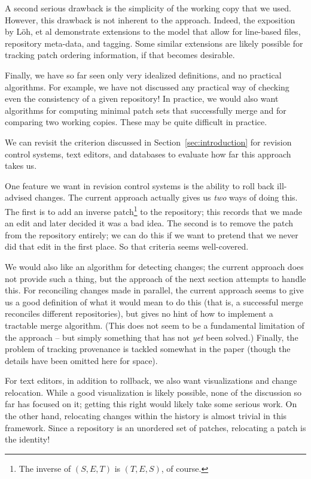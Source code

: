 \documentclass{article}
\newif\ifhighlightnew\highlightnewfalse
\newenvironment{newcontent}{\ifhighlightnew\color{green!55!black}[new]\fi}{\ifhighlightnew\color{black}\fi}
\begin{document}
A second serious drawback is the simplicity of the working copy that we
used. However, this drawback is not inherent to the approach. Indeed, the
exposition by L\"oh, et al demonstrate extensions to the model that allow
for line-based files, repository meta-data, and tagging. Some similar
extensions are likely possible for tracking patch ordering information, if
that becomes desirable.

Finally, we have so far seen only very idealized definitions, and no
practical algorithms. For example, we have not discussed any practical way
of checking even the consistency of a given repository! In practice, we
would also want algorithms for computing minimal patch sets that
successfully merge and for comparing two working copies. These may be quite
difficult in practice.

\begin{newcontent}
We can revisit the criterion discussed in Section~\ref{sec:introduction} for
revision control systems, text editors, and databases to evaluate how far
this approach takes us.

One feature we want in revision control systems is the ability to roll back
ill-advised changes. The current approach actually gives us \emph{two} ways
of doing this. The first is to add an inverse patch\footnote{The inverse of
$(S,E,T)$ is $(T,E,S)$, of course.} to the repository; this records that we
made an edit and later decided it was a bad idea. The second is to remove
the patch from the repository entirely; we can do this if we want to pretend
that we never did that edit in the first place. So that criteria seems
well-covered.

We would also like an algorithm for detecting changes; the current approach
does not provide such a thing, but the approach of the next section attempts
to handle this. For reconciling changes made in parallel, the current
approach seems to give us a good definition of what it would mean to do this
(that is, a successful merge reconciles different repositories), but gives
no hint of how to implement a tractable merge algorithm. (This does not seem
to be a fundamental limitation of the approach -- but simply something that
has not \emph{yet} been solved.) Finally, the problem of tracking provenance
is tackled somewhat in the paper (though the details have been omitted here
for space).

For text editors, in addition to rollback, we also want visualizations and
change relocation. While a good visualization is likely possible, none of
the discussion so far has focused on it; getting this right would likely
take some serious work. On the other hand, relocating changes within the
history is almost trivial in this framework. Since a repository is an
unordered set of patches, relocating a patch is the identity!


\end{newcontent}
\end{document}
